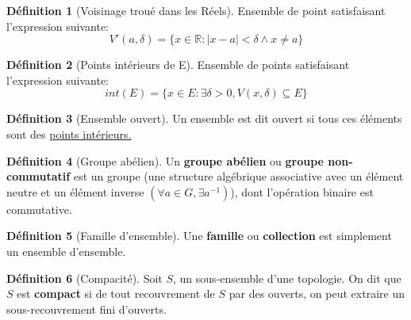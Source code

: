 \documentclass[12pt]{book}
\let\Bbb\mathbb
\theoremstyle{definition}
\newtheorem{definition}{Définition}[section]
\begin{document}
\begin{definition}[Voisinage troué dans les Réels]
    \label{def:voisinage_troue_reels}
    Ensemble de point satisfaisant l'expression
    suivante: $$V'(a, \delta) = \{ x \in \Bbb R : |x - a| < \delta \land x \neq a \}$$
\end{definition}

\begin{definition}[Points intérieurs de E]
    \label{def:point_int}
    Ensemble de points satisfaisant l'expression
    suivante: $$int(E) = \{ x \in E : \exists \delta > 0, V(x, \delta) \subseteq E \} $$
\end{definition}

\begin{definition}[Ensemble ouvert]
    \label{def:ensemble_ouvert}
    Un ensemble est dit ouvert si tous ces éléments sont des \hyperref[def:point_int]{points intérieurs.}
\end{definition}

\begin{definition}[Groupe abélien]
    \label{def:groupe_abelien}
    Un \textbf{groupe abélien} ou \textbf{groupe non-commutatif} est un groupe
    (une structure algébrique associative avec un élément neutre et un élément inverse $(\forall a \in G, \exists a^{-1})$), 
    dont l'opération binaire est commutative.
\end{definition}

\begin{definition}[Famille d'ensemble]
    \label{def:famille}
    Une \textbf{famille} ou \textbf{collection} est simplement un ensemble d'ensemble.
\end{definition}

\begin{definition}[Compacité]
    \label{def:compacite}
    Soit $S$, un sous-ensemble d'une topologie. On dit que $S$ est \textbf{compact} si de tout recouvrement de $S$ par des ouverts, 
    on peut extraire un sous-recouvrement fini d'ouverts.
\end{definition}
\end{document}
